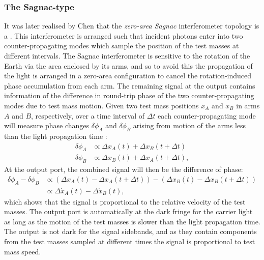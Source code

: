 \subsubsection{The Sagnac-type \SM{}}
It was later realised by Chen that the \emph{zero-area Sagnac} interferometer topology is a \SM{} \cite{Chen2003}. This interferometer is arranged such that incident photons enter into two counter-propagating modes which sample the position of the test masses at different intervals. The Sagnac interferometer is sensitive to the rotation of the Earth via the area enclosed by its arms, and so to avoid this the propagation of the light is arranged in a zero-area configuration to cancel the rotation-induced phase accumulation from each arm. The remaining signal at the output contains information of the difference in round-trip phase of the two counter-propagating modes due to test mass motion. Given two test mass positions $x_{A}$ and $x_{B}$ in arms $A$ and $B$, respectively, over a time interval of $\Delta t$ each counter-propagating mode will measure phase changes $\delta \phi_{A}$ and $\delta \phi_{B}$ arising from motion of the arms less than the light propagation time \cite{Chen2003}:
\begin{align}
  \delta \phi_{A} &\propto \Delta x_{A} \left( t \right) + \Delta x_{B} \left( t + \Delta t \right) \\
  \delta \phi_{B} &\propto \Delta x_{B} \left( t \right) + \Delta x_{A} \left( t + \Delta t \right),
\end{align}
At the output port, the combined signal will then be the difference of phase:
\begin{equation}
  \begin{split}
    \delta \phi_{A} - \delta \phi_{B} &\propto \left( \Delta x_{A} \left( t \right) - \Delta x_{A} \left( t + \Delta t \right) \right) - \left( \Delta x_{B} \left( t \right) - \Delta x_{B} \left( t + \Delta t \right) \right) \\
                                      &\propto \Delta \dot{x}_{A} \left( t \right) - \Delta \dot{x}_{B} \left( t \right),
  \end{split}
\end{equation}
which shows that the signal is proportional to the relative velocity of the test masses. The output port is automatically at the dark fringe for the carrier light as long as the motion of the test masses is slower than the light propagation time. The output is not dark for the signal sidebands, and as they contain components from the test masses sampled at different times the signal is proportional to test mass speed.


